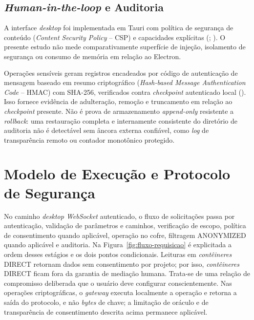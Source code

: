 \documentclass[12pt,openright,twoside,a4paper,english,brazil]{abntex2}
\begin{document}
\subsection{\textit{Human-in-the-loop} e Auditoria}
A interface \textit{desktop} foi implementada em Tauri com política de segurança de conteúdo (\textit{Content Security Policy} -- CSP) e capacidades explícitas (; ). O presente estudo não mede comparativamente superfície de injeção, isolamento de segurança ou consumo de memória em relação ao Electron.

Operações sensíveis geram registros encadeados por código de autenticação de mensagem baseado em resumo criptográfico (\textit{Hash-based Message Authentication Code} -- HMAC) com SHA-256, verificados contra \textit{checkpoint} autenticado local (). Isso fornece evidência de adulteração, remoção e truncamento em relação ao \textit{checkpoint} presente. Não é prova de armazenamento \textit{append-only} resistente a \textit{rollback}: uma restauração completa e internamente consistente do diretório de auditoria não é detectável sem âncora externa confiável, como \textit{log} de transparência remoto ou contador monotônico protegido.

\section{Modelo de Execução e Protocolo de Segurança}
No caminho \textit{desktop WebSocket} autenticado, o fluxo de solicitações passa por autenticação, validação de parâmetros e caminhos, verificação de escopo, política de consentimento quando aplicável, operação no cofre, filtragem ANONYMIZED quando aplicável e auditoria. Na Figura~\ref{fig:fluxo-requisicao} é explicitada a ordem desses estágios e os dois pontos condicionais. Leituras em \textit{contêineres} DIRECT retornam dados sem consentimento por projeto; por isso, \textit{contêineres} DIRECT ficam fora da garantia de mediação humana. Trata-se de uma relação de compromisso deliberada que o usuário deve configurar conscientemente. Nas operações criptográficas, o \textit{gateway} executa localmente a operação e retorna a saída do protocolo, e não \textit{bytes} de chave; a limitação de oráculo e de transparência de consentimento descrita acima permanece aplicável.
\end{document}
